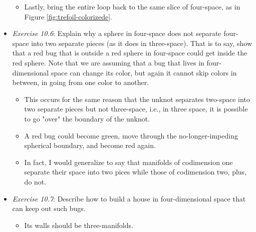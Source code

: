 \documentclass[titlepage]{article}
\numberwithin{figure}{section}
\numberwithin{table}{section}
\numberwithin{equation}{section}
\begin{document}
\begin{itemize}
\begin{itemize}
        \item Lastly, bring the entire loop back to the same slice of four-space, as in Figure \ref{fig:trefoil-colorizede}.
    \end{itemize}
    \item \emph{Exercise 10.6}: Explain why a sphere in four-space does not separate four-space into two separate pieces (as it does in three-space). That is to say, show that a red bug that is outside a red sphere in four-space could get inside the red sphere. Note that we are assuming that a bug that lives in four-dimensional space can change its color, but again it cannot skip colors in between, in going from one color to another.
    \begin{itemize}
        \item This occurs for the same reason that the unknot separates two-space into two separate pieces but not three-space, i.e., in three space, it is possible to go "over" the boundary of the unknot.
        \item A red bug could become green, move through the no-longer-impeding spherical boundary, and become red again.
        \item In fact, I would generalize to say that manifolds of codimension one separate their space into two pices while those of codimension two, plus, do not.
    \end{itemize}
    \item \emph{Exercise 10.7}: Describe how to build a house in four-dimensional space that can keep out such bugs.
    \begin{itemize}
        \item Its walls should be three-manifolds.
    \end{itemize}
\end{itemize}
\end{document}
